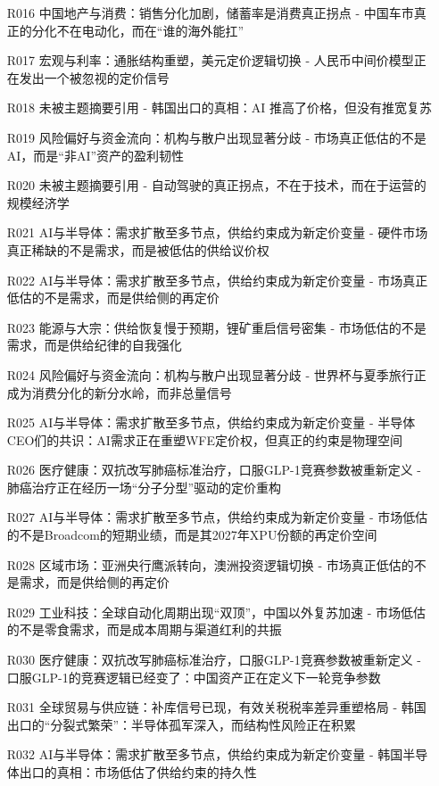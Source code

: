 \documentclass[11pt]{ctexart}
\begin{document}
\begin{itemize}
  \item [R016] 中国地产与消费：销售分化加剧，储蓄率是消费真正拐点 - 中国车市真正的分化不在电动化，而在“谁的海外能扛”
  \item [R017] 宏观与利率：通胀结构重塑，美元定价逻辑切换 - 人民币中间价模型正在发出一个被忽视的定价信号
  \item [R018] 未被主题摘要引用 - 韩国出口的真相：AI 推高了价格，但没有推宽复苏
  \item [R019] 风险偏好与资金流向：机构与散户出现显著分歧 - 市场真正低估的不是AI，而是“非AI”资产的盈利韧性
  \item [R020] 未被主题摘要引用 - 自动驾驶的真正拐点，不在于技术，而在于运营的规模经济学
  \item [R021] AI与半导体：需求扩散至多节点，供给约束成为新定价变量 - 硬件市场真正稀缺的不是需求，而是被低估的供给议价权
  \item [R022] AI与半导体：需求扩散至多节点，供给约束成为新定价变量 - 市场真正低估的不是需求，而是供给侧的再定价
  \item [R023] 能源与大宗：供给恢复慢于预期，锂矿重启信号密集 - 市场低估的不是需求，而是供给纪律的自我强化
  \item [R024] 风险偏好与资金流向：机构与散户出现显著分歧 - 世界杯与夏季旅行正成为消费分化的新分水岭，而非总量信号
  \item [R025] AI与半导体：需求扩散至多节点，供给约束成为新定价变量 - 半导体CEO们的共识：AI需求正在重塑WFE定价权，但真正的约束是物理空间
  \item [R026] 医疗健康：双抗改写肺癌标准治疗，口服GLP-1竞赛参数被重新定义 - 肺癌治疗正在经历一场“分子分型”驱动的定价重构
  \item [R027] AI与半导体：需求扩散至多节点，供给约束成为新定价变量 - 市场低估的不是Broadcom的短期业绩，而是其2027年XPU份额的再定价空间
  \item [R028] 区域市场：亚洲央行鹰派转向，澳洲投资逻辑切换 - 市场真正低估的不是需求，而是供给侧的再定价
  \item [R029] 工业科技：全球自动化周期出现“双顶”，中国以外复苏加速 - 市场低估的不是零食需求，而是成本周期与渠道红利的共振
  \item [R030] 医疗健康：双抗改写肺癌标准治疗，口服GLP-1竞赛参数被重新定义 - 口服GLP-1的竞赛逻辑已经变了：中国资产正在定义下一轮竞争参数
  \item [R031] 全球贸易与供应链：补库信号已现，有效关税税率差异重塑格局 - 韩国出口的“分裂式繁荣”：半导体孤军深入，而结构性风险正在积累
  \item [R032] AI与半导体：需求扩散至多节点，供给约束成为新定价变量 - 韩国半导体出口的真相：市场低估了供给约束的持久性

\end{itemize}
\end{document}
